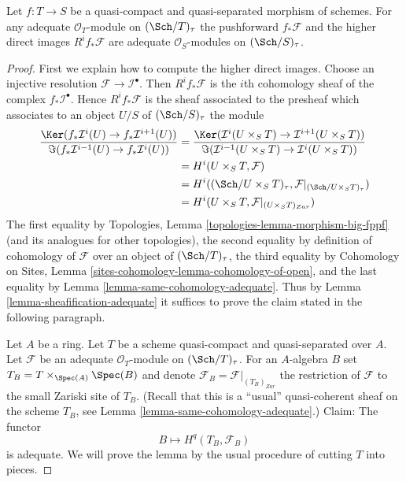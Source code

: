 \begin{lemma}
\label{lemma-direct-image-adequate}
Let $f : T \to S$ be a quasi-compact and quasi-separated morphism
of schemes. For any adequate $\mathcal{O}_T$-module on
$(\Sch/T)_\tau$ the pushforward
$f_*\mathcal{F}$ and the higher direct images $R^if_*\mathcal{F}$
are adequate $\mathcal{O}_S$-modules on $(\Sch/S)_\tau$.
\end{lemma}

\begin{proof}
First we explain how to compute the higher direct images.
Choose an injective resolution $\mathcal{F} \to \mathcal{I}^\bullet$.
Then $R^if_*\mathcal{F}$ is the $i$th cohomology sheaf of the
complex $f_*\mathcal{I}^\bullet$.
Hence $R^if_*\mathcal{F}$ is the sheaf associated to the presheaf
which associates to an object $U/S$ of $(\Sch/S)_\tau$
the module
\begin{align*}
\frac{\Ker(f_*\mathcal{I}^i(U) \to f_*\mathcal{I}^{i + 1}(U))}
{\Im(f_*\mathcal{I}^{i - 1}(U) \to f_*\mathcal{I}^i(U))}
& =
\frac{\Ker(\mathcal{I}^i(U \times_S T) \to
\mathcal{I}^{i + 1}(U \times_S T))}
{\Im(\mathcal{I}^{i - 1}(U \times_S T) \to \mathcal{I}^i(U \times_S T))}
\\
& =
H^i(U \times_S T, \mathcal{F}) \\
& = H^i((\Sch/U \times_S T)_\tau,
\mathcal{F}|_{(\Sch/U \times_S T)_\tau}) \\
& = H^i(U \times_S T, \mathcal{F}|_{(U \times_S T)_{Zar}})
\end{align*}
The first equality by
Topologies, Lemma \ref{topologies-lemma-morphism-big-fppf}
(and its analogues for other topologies),
the second equality by definition of cohomology of $\mathcal{F}$
over an object of $(\Sch/T)_\tau$,
the third equality by
Cohomology on Sites, Lemma \ref{sites-cohomology-lemma-cohomology-of-open},
and the last equality by
Lemma \ref{lemma-same-cohomology-adequate}.
Thus by
Lemma \ref{lemma-sheafification-adequate}
it suffices to prove the claim stated in the following paragraph.

\medskip\noindent
Let $A$ be a ring. Let $T$ be a scheme quasi-compact and quasi-separated
over $A$. Let $\mathcal{F}$ be an adequate $\mathcal{O}_T$-module on
$(\Sch/T)_\tau$. For an $A$-algebra $B$ set
$T_B = T \times_{\Spec(A)} \Spec(B)$ and denote
$\mathcal{F}_B = \mathcal{F}|_{(T_B)_{Zar}}$ the restriction of
$\mathcal{F}$ to the small Zariski site of $T_B$.
(Recall that this is a ``usual'' quasi-coherent sheaf on the scheme
$T_B$, see
Lemma \ref{lemma-same-cohomology-adequate}.)
Claim: The functor
$$
B \longmapsto H^q(T_B, \mathcal{F}_B)
$$
is adequate. We will prove the lemma by the usual
procedure of cutting $T$ into pieces.


\end{proof}
